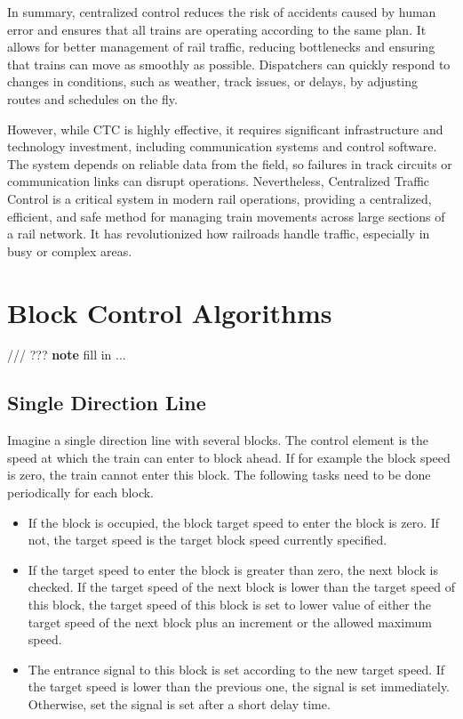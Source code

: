 In summary, centralized control reduces the risk of accidents caused by human error and ensures that all trains are operating according to the same plan. It allows for better management of rail traffic, reducing bottlenecks and ensuring that trains can move as smoothly as possible. Dispatchers can quickly respond to changes in conditions, such as weather, track issues, or delays, by adjusting routes and schedules on the fly.

However, while CTC is highly effective, it requires significant infrastructure and technology investment, including communication systems and control software. The system depends on reliable data from the field, so failures in track circuits or communication links can disrupt operations. Nevertheless, Centralized Traffic Control is a critical system in modern rail operations, providing a centralized, efficient, and safe method for managing train movements across large sections of a rail network. It has revolutionized how railroads handle traffic, especially in busy or complex areas.

\section{Block Control Algorithms}

/// ??? \textbf{note} fill in ...

\subsection{Single Direction Line}

Imagine a single direction line with several blocks. The control element is the speed at which the train can enter to block ahead. If for example the block speed is zero, the train cannot enter this block. The following tasks need to be done periodically for each block.
\begin{itemize}
\item If the block is occupied, the block target speed to enter the block is zero. If not, the target speed is the target block speed currently specified.
\item If the target speed to enter the block is greater than zero, the next block is checked. If the target speed of the next block is lower than the target speed of this block, the target speed of this block is set to lower value of either the target speed of the next block plus an increment or the allowed maximum speed.
\item The entrance signal to this block is set according to the new target speed. If the target speed is lower than the previous one, the signal is set immediately. Otherwise, set the signal is set after a short delay time.
\end{itemize}

